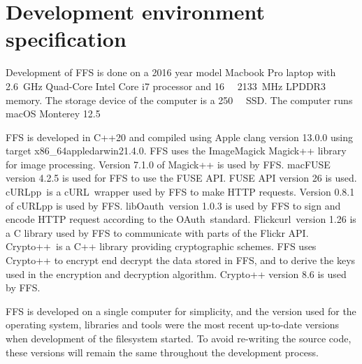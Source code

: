 \section{Development environment specification}
\label{sec:dev_env}
Development of FFS is done on a 2016 year model Macbook Pro laptop with \SI{2.6}{\giga\hertz} Quad-Core Intel Core i7 processor and \SI{16}{\giga\byte} \SI{2133}{\mega\hertz} LPDDR3 memory. The storage device of the computer is a \SI{250}{\giga\byte} SSD. The computer runs macOS Monterey 12.5

FFS is developed in C++20 and compiled using Apple clang version 13.0.0 using target x86\_64\-apple\-darwin21.4.0. FFS uses the ImageMagick Magick++ library\,\cite{ImageMagick2022} for image processing. Version 7.1.0 of Magick++ is used by FFS. macFUSE\,\cite{HomeMacFUSE} version 4.2.5 is used for FFS to use the FUSE API. FUSE API version 26 is used. cURLpp\,\cite{barrette-lapierreCURLpp2022} is a cURL\,\cite{CurlCurl2022} wrapper used by FFS to make HTTP requests. Version 0.8.1 of cURLpp is used by FFS. libOauth\,\cite{Liboauth} version 1.0.3 is used by FFS to sign and encode HTTP request according to the OAuth\,\cite{barrette-lapierreCURLpp2022} standard. Flickcurl\,\cite{beckettFlickcurlLibraryFlickr} version 1.26 is a C library used by FFS to communicate with parts of the Flickr API. Crypto++\,\cite{CryptoLibraryFree} is a C++ library providing cryptographic schemes. FFS uses Crypto++ to encrypt end decrypt the data stored in FFS, and to derive the keys used in the encryption and decryption algorithm. Crypto++ version 8.6 is used by FFS.

FFS is developed on a single computer for simplicity, and the version used for the operating system, libraries and tools were the most recent up-to-date versions when development of the filesystem started. To avoid re-writing the source code, these versions will remain the same throughout the development process.